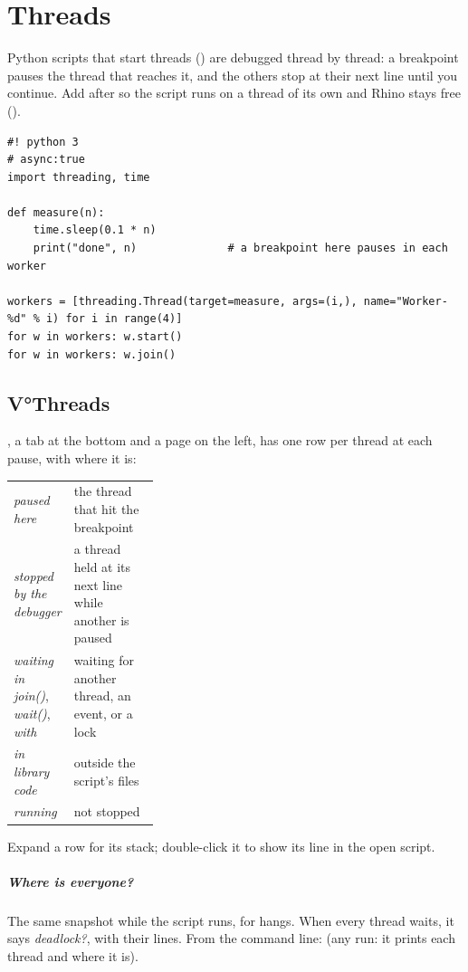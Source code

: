 \chapter{Threads}\label{ch:threads}

Python scripts that start threads () are debugged thread by thread: a breakpoint
pauses the thread that reaches it, and the others stop at their next line until you continue. Add
 after  so the script runs on a thread of its own and Rhino stays
free ().

\begin{lstlisting}
#! python 3
# async:true
import threading, time

def measure(n):
    time.sleep(0.1 * n)
    print("done", n)              # a breakpoint here pauses in each worker

workers = [threading.Thread(target=measure, args=(i,), name="Worker-%d" % i) for i in range(4)]
for w in workers: w.start()
for w in workers: w.join()
\end{lstlisting}

\section{V°Threads}\label{sec:vthreads}

, a tab at the bottom and a page on the left, has one row per thread at each pause, with where it is:

\begin{xltabular}{\linewidth}{@{}P{0.32\linewidth}L@{}}
\toprule
\emph{paused here}              & the thread that hit the breakpoint \\
\emph{stopped by the debugger}  & a thread held at its next line while another is paused \\
\emph{waiting in join()}, \emph{wait()}, \emph{with} & waiting for another thread, an event, or a lock \\
\emph{in library code}          & outside the script's files \\
\emph{running}                  & not stopped \\
\bottomrule
\end{xltabular}

Expand a row for its stack; double-click it to show its line in the open script.

\paragraph{Where is everyone?} The same snapshot while the script runs, for hangs. When every thread waits,
it says \emph{deadlock?}, with their lines. From the command line: 
(any run: it prints each thread and where it is).

